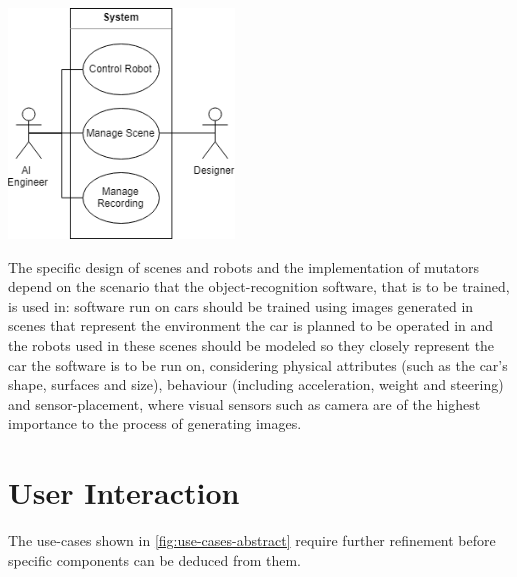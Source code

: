 \begin{center}
\noindent\includegraphics[width=6cm]{tex/img/ch04/Use_Cases_06.png}
\label{fig:use-cases-abstract}
\end{center}

The specific design of scenes and robots and the implementation of mutators depend on the scenario that the object-recognition software, that is to be trained, is used in: software run on cars should be trained using images generated in scenes that represent the environment the car is planned to be operated in and the robots used in these scenes should be modeled so they closely represent the car the software is to be run on, considering physical attributes (such as the car's shape, surfaces and size), behaviour (including acceleration, weight and steering)  and sensor-placement, where visual sensors such as camera are of the highest importance to the process of generating images.


\section{User Interaction}
The use-cases shown in \ref{fig:use-cases-abstract} require further refinement before specific components can be deduced from them.

